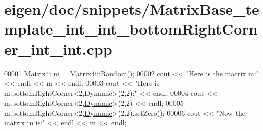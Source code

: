 \hypertarget{eigen_2doc_2snippets_2_matrix_base__template__int__int__bottom_right_corner__int__int_8cpp_source}{}\section{eigen/doc/snippets/\+Matrix\+Base\+\_\+template\+\_\+int\+\_\+int\+\_\+bottom\+Right\+Corner\+\_\+int\+\_\+int.cpp}
\label{eigen_2doc_2snippets_2_matrix_base__template__int__int__bottom_right_corner__int__int_8cpp_source}

\begin{DoxyCode}
00001 Matrix4i m = Matrix4i::Random();
00002 cout << \textcolor{stringliteral}{"Here is the matrix m:"} << endl << m << endl;
00003 cout << \textcolor{stringliteral}{"Here is m.bottomRightCorner<2,Dynamic>(2,2):"} << endl;
00004 cout << m.bottomRightCorner<2,\hyperlink{namespace_eigen_ad81fa7195215a0ce30017dfac309f0b2}{Dynamic}>(2,2) << endl;
00005 m.bottomRightCorner<2,\hyperlink{namespace_eigen_ad81fa7195215a0ce30017dfac309f0b2}{Dynamic}>(2,2).setZero();
00006 cout << \textcolor{stringliteral}{"Now the matrix m is:"} << endl << m << endl;
\end{DoxyCode}
